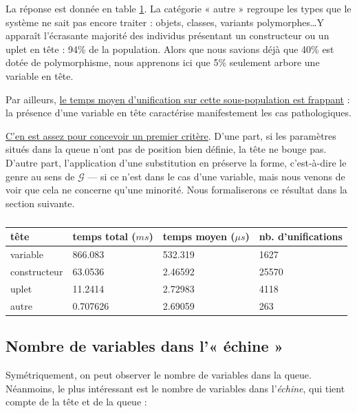 \documentclass[a4paper]{report}
\theoremstyle{definition}
\newcommand{\G}{\mathscr{G}}
\newcommand\gab[1]{{\bf\color{Orange}{TODO: #1}}\\}
\newcommand\reformule[1]{\underline{#1}}
\begin{document}
La réponse est donnée en table \ref{tab_meas2}. La catégorie « autre » regroupe les types que le système ne sait pas encore traiter : objets, classes, variants polymorphes\dots Y apparaît l'écrasante majorité des individus présentant un constructeur ou un uplet en tête : 94\% de la population. Alors que nous savions déjà que 40\% est dotée de polymorphisme, nous apprenons ici que 5\% seulement arbore une variable en tête. {Par ailleurs, \reformule{le temps moyen d'unification sur cette sous-population est frappant} : la présence d'une variable en tête caractérise manifestement les cas pathologiques.

\reformule{C'en est assez pour concevoir un premier critère}. D'une part, si les paramètres situés dans la queue n'ont pas de position bien définie, la tête ne bouge pas. D'autre part, l'application d'une substitution en préserve la forme, c'est-à-dire le genre au sens de $\G$ — si ce n'est dans le cas d'une variable, mais nous venons de voir que cela ne concerne qu'une minorité. Nous formaliserons ce résultat dans la section suivante.
\gab{Pas compris ce paragraph, clarifier.}

\begin{table}[h]
  \centering
  \begin{tabular}{|l|l|l|l|}
    \hline
      tête &
      temps total ($ms$) &
      temps moyen ($\mu s$) &
      nb. d'unifications
    \\
    \hline
      variable & 866.083 & 532.319 & 1627
    \\
      constructeur & 63.0536 & 2.46592 & 25570
    \\
      uplet & 11.2414 & 2.72983 & 4118
    \\
      autre & 0.707626 & 2.69059 & 263
    \\
    \hline
  \end{tabular}
  \caption{\label{tab_meas2}}
\end{table}


\subsection{Nombre de variables dans l'« échine »}

Symétriquement, on peut observer le nombre de variables dans la queue. Néanmoins, le plus intéressant est le nombre de variables dans l'\emph{échine}, qui tient compte de la tête et de la queue :

}
\end{document}
